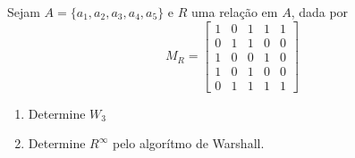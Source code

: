 \item 
		Sejam $A=\{a_1,a_2,a_3,a_4,a_5\}$ e $R$ uma relação  em $A$, dada por 
\[ 
M_R=\begin{bmatrix}
1 & 0 & 1 & 1 & 1\\
0 & 1 & 1 & 0 & 0\\
1 & 0 & 0 & 1 & 0\\
1 & 0 & 1 & 0 & 0\\
0 & 1 & 1 & 1 & 1
\end{bmatrix}
\]
\begin{enumerate}
		\item Determine $W_3$
		\item Determine $R^{\infty}$ pelo algorítmo de Warshall.
\end{enumerate}
